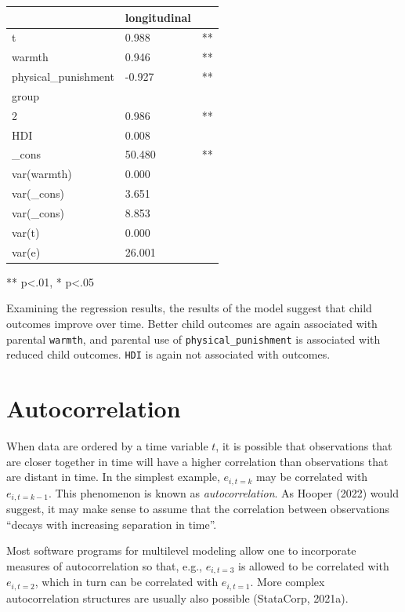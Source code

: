 \documentclass[
  letterpaper,
  DIV=11,
  numbers=noendperiod]{scrreprt}
\begin{document}
\begin{longtable}[]{@{}lll@{}}
\toprule\noalign{}
& longitudinal & \\
\midrule\noalign{}
\endhead
\bottomrule\noalign{}
\endlastfoot
t & 0.988 & ** \\
warmth & 0.946 & ** \\
physical\_punishment & -0.927 & ** \\
group & & \\
2 & 0.986 & ** \\
HDI & 0.008 & \\
\_cons & 50.480 & ** \\
var(warmth) & 0.000 & \\
var(\_cons) & 3.651 & \\
var(\_cons) & 8.853 & \\
var(t) & 0.000 & \\
var(e) & 26.001 & \\
\end{longtable}

** p\textless.01, * p\textless.05

Examining the regression results, the results of the model suggest that
child outcomes improve over time. Better child outcomes are again
associated with parental \texttt{warmth}, and parental use of
\texttt{physical\_punishment} is associated with reduced child outcomes.
\texttt{HDI} is again not associated with outcomes.

\hypertarget{autocorrelation}{%
\section{Autocorrelation}\label{autocorrelation}}

When data are ordered by a time variable \(t\), it is possible that
observations that are closer together in time will have a higher
correlation than observations that are distant in time. In the simplest
example, \(e_{i, t=k}\) may be correlated with \(e_{i, t=k-1}\). This
phenomenon is known as \emph{autocorrelation}. As Hooper (2022) would
suggest, it may make sense to assume that the correlation between
observations ``decays with increasing separation in time''.

Most software programs for multilevel modeling allow one to incorporate
measures of autocorrelation so that, e.g., \(e_{i,t=3}\) is allowed to
be correlated with \(e_{i,t=2}\), which in turn can be correlated with
\(e_{i,t=1}\). More complex autocorrelation structures are usually also
possible (StataCorp, 2021a).
\end{document}
